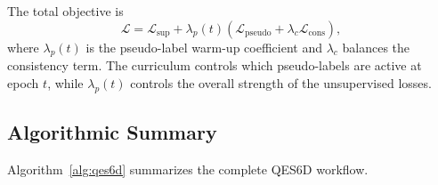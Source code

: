 \documentclass[preprint,12pt]{elsarticle}
\begin{document}
The total objective is
\begin{equation}
\mathcal{L}
=
\mathcal{L}_{\mathrm{sup}}
+
\lambda_p(t)
\left(
\mathcal{L}_{\mathrm{pseudo}}
+
\lambda_c\mathcal{L}_{\mathrm{cons}}
\right),
\label{eq:total_loss}
\end{equation}
where $\lambda_p(t)$ is the pseudo-label warm-up coefficient and $\lambda_c$ balances the consistency term. The curriculum controls which pseudo-labels are active at epoch $t$, while $\lambda_p(t)$ controls the overall strength of the unsupervised losses.
\subsection{Algorithmic Summary}
\label{sec:algorithm_summary}

Algorithm~\ref{alg:qes6d} summarizes the complete QES6D workflow.
\end{document}
